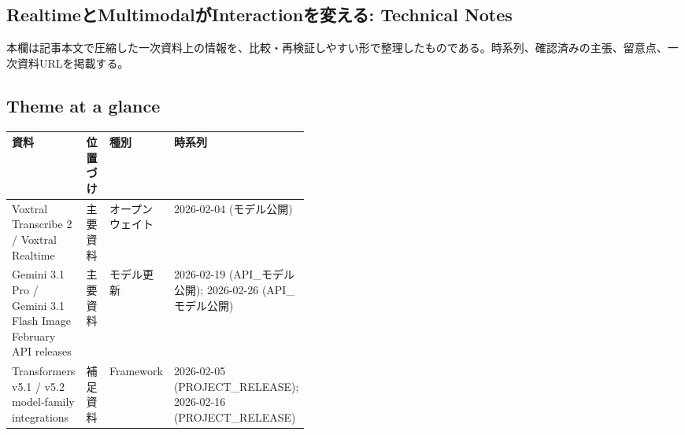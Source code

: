 \subsection*{RealtimeとMultimodalがInteractionを変える: Technical Notes}
本欄は記事本文で圧縮した一次資料上の情報を、比較・再検証しやすい形で整理したものである。時系列、確認済みの主張、留意点、一次資料URLを掲載する。
\medskip
\subsection*{Theme at a glance}
\begin{center}
\footnotesize
\begin{tabularx}{\linewidth}{@{}p{0.20\linewidth}p{0.10\linewidth}p{0.14\linewidth}X@{}}
\toprule
資料 & 位置づけ & 種別 & 時系列 \\
\midrule
Voxtral Transcribe 2 / Voxtral Realtime & 主要資料 & オープンウェイト & 2026-02-04 (モデル公開) \\
Gemini 3.1 Pro / Gemini 3.1 Flash Image February API releases & 主要資料 & モデル更新 & 2026-02-19 (API\_モデル公開); 2026-02-26 (API\_モデル公開) \\
Transformers v5.1 / v5.2 model-family integrations & 補足資料 & Framework & 2026-02-05 (PROJECT\_RELEASE); 2026-02-16 (PROJECT\_RELEASE) \\
\bottomrule
\end{tabularx}
\end{center}
\normalsize

